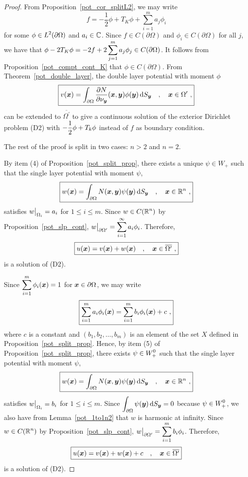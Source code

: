 \begin{proof}
  From Proposition~\ref{pot_cor_splitL2}, we may write
\[
\boxed{
f = - \frac{1}{2} \phi + T_K \phi + \sum_{i=1}^m a_j \phi_i
}
\]
for some $\displaystyle \phi \in L^2(\partial \Omega)$ and $a_i \in \mathbb{C}$.
Since $f\in C(\partial \Omega)$ and $\phi_i \in C(\partial \Omega)$
for all $j$, we have that
$\displaystyle
\phi -2 T_K \phi = -2f + 2 \sum_{j=1}^m a_j \phi_j \in C(\partial \Omega)$.
It follows from Proposition~\ref{pot_compt_cont_K} that
$\phi \in C(\partial \Omega)$.  From Theorem~\ref{pot_double_layer},
the double layer potential with moment $\phi$
\[
\boxed{
v({\bm{x}}) = \int_{\partial \Omega}
\frac{\partial{N}}{\partial \nu_{{\bm{y}}}}({\bm{x}},{\bm{y}}) \phi({\bm{y}})
\,\mathrm{d}{S}_{{\bm{y}}} \quad , \quad {\bm{x}} \in \Omega^{\prime} \ ,
}
\]
can be extended to $\overline{\Omega^{\prime}}$ to give a continuous
solution of the exterior Dirichlet problem (D2) with
$\displaystyle -\frac{1}{2} \phi + T_k \phi$ instead of $f$ as boundary
condition.

The rest of the proof is split in two cases: $n>2$ and $n=2$.

By item (4) of Proposition~\ref{pot_split_prop}, there
exists a unique $\psi \in W_+$ such that the single layer potential
with moment $\psi$,
\[
\boxed{
w({\bm{x}}) = \int_{\partial \Omega} N({\bm{x}},{\bm{y}})
\psi({\bm{y}}) \,\mathrm{d}{S}_{{\bm{y}}} \quad , \quad {\bm{x}} \in \mathbb{R}^n \ ,
}
\]
satisfies $\displaystyle w\big|_{\Omega_i} = a_i$ for
$1\leq i \leq m$.
Since $\displaystyle w \in C(\mathbb{R}^n)$ by Proposition~\ref{pot_slp_cont},
$\displaystyle 
w\big|_{\partial \Omega^{\prime}} = \sum_{i=1}^\infty a_i \phi_i$.
Therefore,
\[
\boxed{
u({\bm{x}}) = v({\bm{x}}) + w({\bm{x}}) \quad , \quad {\bm{x}} \in
\overline{\Omega^{\prime}} \ ,
}
\]
is a solution of (D2).

Since
$\displaystyle \sum_{i=1}^m \phi_i({\bm{x}}) = 1$ for
${\bm{x}} \in \partial \Omega$, we may write
\[
\boxed{
\sum_{i=1}^m a_i \phi_i({\bm{x}}) = \sum_{i=1}^m b_i \phi_i({\bm{x}}) + c \ ,
}
\]
where $c$ is a constant and $(b_1,b_2, \ldots, b_m)$ is an element of
the set $X$ defined in Proposition~\ref{pot_split_prop}.  Hence, by
item (5) of Proposition~\ref{pot_split_prop}, there
exists $\displaystyle \psi \in W_+^0$ such that the single layer
potential with moment $\psi$,
\[
\boxed{
w({\bm{x}}) = \int_{\partial \Omega} N({\bm{x}},{\bm{y}})
\psi({\bm{y}}) \,\mathrm{d}{S}_{{\bm{y}}} \quad , \quad {\bm{x}} \in \mathbb{R}^n \  ,
}
\]
satisfies $\displaystyle w\big|_{\Omega_i} = b_i$ for
$1\leq i \leq m$.  Since
$\displaystyle \int_{\partial \Omega} \psi({\bm{y}}) \,\mathrm{d}{S}_{{\bm{y}}} = 0$
because $\displaystyle \psi\in W_+^0$, we also have from
Lemma~\ref{pot_1to1n2} that $w$ is harmonic at infinity.  Since
$\displaystyle w \in C(\mathbb{R}^n)$ by 
Proposition~\ref{pot_slp_cont},
$\displaystyle w\big|_{\partial \Omega^{\prime}} = \sum_{i=1}^m b_i \phi_i$.
Therefore,
\[
\boxed{
u({\bm{x}}) = v({\bm{x}}) + w({\bm{x}}) + c \quad , \quad {\bm{x}} \in
\overline{\Omega^{\prime}}
}
\]
is a solution of (D2).
\end{proof}

